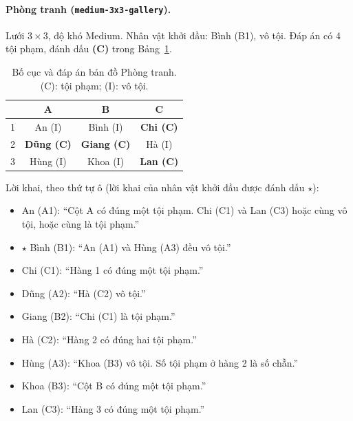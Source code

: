 \paragraph{Phòng tranh (\texttt{medium-3x3-gallery}).}
Lưới $3\times3$, độ khó Medium. Nhân vật khởi đầu: Bình (B1), vô tội. Đáp án có 4 tội phạm, đánh dấu \textbf{(C)} trong Bảng~\ref{tab:map_gallery}.
\begin{table}[htbp]
  \centering\small
  \caption{Bố cục và đáp án bản đồ Phòng tranh. (C): tội phạm; (I): vô tội.}
  \label{tab:map_gallery}
  \begin{tabular}{cccc}
    \toprule
    & A & B & C \\
    \midrule
    1 & An (I) & Bình (I) & \textbf{Chi (C)} \\
    2 & \textbf{Dũng (C)} & \textbf{Giang (C)} & Hà (I) \\
    3 & Hùng (I) & Khoa (I) & \textbf{Lan (C)} \\
    \bottomrule
  \end{tabular}
\end{table}
\noindent Lời khai, theo thứ tự ô (lời khai của nhân vật khởi đầu được đánh dấu $\star$):
\begin{itemize}\setlength{\itemsep}{0pt}\small
  \item An (A1): ``Cột A có đúng một tội phạm. Chi (C1) và Lan (C3) hoặc cùng vô tội, hoặc cùng là tội phạm.''
  \item $\star$ Bình (B1): ``An (A1) và Hùng (A3) đều vô tội.''
  \item Chi (C1): ``Hàng 1 có đúng một tội phạm.''
  \item Dũng (A2): ``Hà (C2) vô tội.''
  \item Giang (B2): ``Chi (C1) là tội phạm.''
  \item Hà (C2): ``Hàng 2 có đúng hai tội phạm.''
  \item Hùng (A3): ``Khoa (B3) vô tội. Số tội phạm ở hàng 2 là số chẵn.''
  \item Khoa (B3): ``Cột B có đúng một tội phạm.''
  \item Lan (C3): ``Hàng 3 có đúng một tội phạm.''
\end{itemize}

